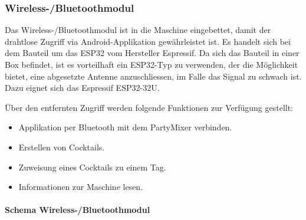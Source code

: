 \subsubsection{Wireless-/Bluetoothmodul}
\label{subsubsec:ESP}


Das Wireless-/Bluetoothmodul ist in die Maschine eingebettet, damit der drahtlose Zugriff via Android-Applikation gewährleistet ist. Es handelt sich bei dem Bauteil um das ESP32 vom Hersteller Espressif. Da sich das Bauteil in einer Box befindet, ist es vorteilhaft ein ESP32-Typ zu verwenden, der die Möglichkeit bietet, eine abgesetzte Antenne anzuschliessen, im Falle das Signal zu schwach ist. Dazu eignet sich das Espressif ESP32-32U.

Über den entfernten Zugriff werden folgende Funktionen zur Verfügung gestellt:
\begin{itemize}
\item Applikation per Bluetooth mit dem PartyMixer verbinden.
\item Erstellen von Cocktails.
\item Zuweisung eines Cocktails zu einem Tag.
\item Informationen zur Maschine lesen.
\end{itemize}

%

\paragraph{Schema Wireless-/Bluetoothmodul}\mbox{}

